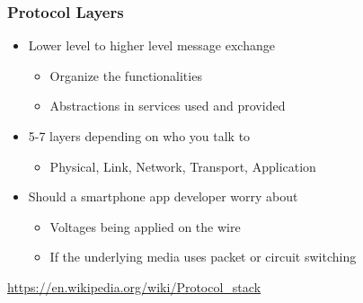 \subsubsection{Protocol Layers}
\begin{itemize}[nosep]
    \item Lower level to higher level message exchange
          \begin{itemize}[nosep]
              \item Organize the functionalities
              \item Abstractions in services used and provided
          \end{itemize}
    \item 5-7 layers depending on who you talk to
          \begin{itemize}[nosep]
              \item Physical, Link, Network, Transport, Application
          \end{itemize}
    \item Should a smartphone app developer worry about
          \begin{itemize}[nosep]
              \item Voltages being applied on the wire
              \item If the underlying media uses packet or circuit switching
          \end{itemize}
\end{itemize}
\url{https://en.wikipedia.org/wiki/Protocol_stack}
